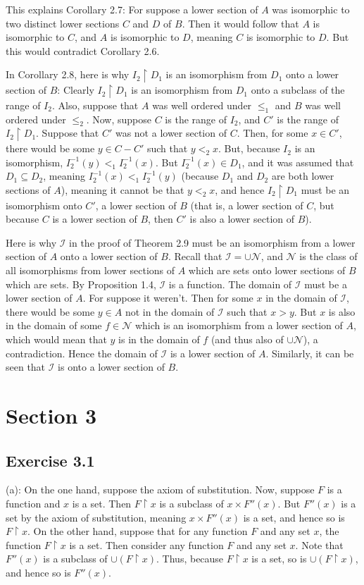 \documentclass{article}
\theoremstyle{definition}
\begin{document}
This explains Corollary 2.7: For suppose a lower section of $A$ was isomorphic to two distinct lower sections $C$ and $D$ of $B$. Then it would follow that 
$A$ is isomorphic to $C$, and $A$ is isomorphic to $D$, meaning $C$ is isomorphic to $D$. But this would contradict Corollary 2.6.

In Corollary 2.8, here is why $I_2\restriction D_1$ is an isomorphism from $D_1$ onto a lower section of $B$: Clearly $I_2\restriction D_1$ is an 
isomorphism from $D_1$ onto a subclass of the range of $I_2$. Also, suppose that $A$ was well ordered under $\le_1$ and $B$ was well ordered under $\le_2$. 
Now, suppose $C$ is the range of $I_2$, and $C'$ is the range of $I_2\restriction D_1$. Suppose that 
$C'$ was not a lower section of $C$. Then, for some $x\in C'$, there would be some $y\in C-C'$ such that $y<_2x$. But, because $I_2$ is an isomorphism, 
$I_2^{-1}(y)<_1I_2^{-1}(x)$. But $I_2^{-1}(x)\in D_1$, and it was assumed that $D_1\subseteq D_2$, meaning $I_2^{-1}(x)<_1I_2^{-1}(y)$ (because 
$D_1$ and $D_2$ are both lower sections of $A$), meaning it cannot be that $y<_2x$, and hence $I_2\restriction D_1$ must be an isomorphism onto $C'$, 
a lower section of $B$ (that is, a lower section of $C$, but because $C$ is a lower section of $B$, then $C'$ is also a lower section of $B$).

Here is why $\mathcal{I}$ in the proof of Theorem 2.9 must be an isomorphism from a lower section of $A$ onto a lower section of $B$. Recall that 
$\mathcal{I}=\cup\mathcal{N}$, and $\mathcal{N}$ is the class of all isomorphisms from lower sections of $A$ which are sets onto lower sections of $B$ which are sets.
By Proposition 1.4, $\mathcal{I}$ is a function. The domain of $\mathcal{I}$ must be a lower section of $A$. For suppose it weren't. Then for some 
$x$ in the domain of $\mathcal{I}$, there would be some $y\in A$ not in the domain of $\mathcal{I}$ such that $x>y$. But $x$ is also in the domain of 
some $f\in\mathcal{N}$ which is an isomorphism from a lower section of $A$, which would mean that $y$ is in the domain of $f$ (and thus also of $\cup\mathcal{N}$), a contradiction. Hence 
the domain of $\mathcal{I}$ is a lower section of $A$. Similarly, it can be seen that $\mathcal{I}$ is onto a lower section of $B$.

\section*{Section 3}

\subsection*{Exercise 3.1}
(a): On the one hand, suppose the axiom of substitution. Now, suppose $F$ is a function and $x$ is a set. Then $F\restriction x$ is a subclass of 
$x\times F''(x)$. But $F''(x)$ is a set by the axiom of substitution, meaning $x\times F''(x)$ is a set, and hence so is $F\restriction x$. On the other hand, 
suppose that for any function $F$ and any set $x$, the function $F\restriction x$ is a set. Then consider any function $F$ and any set $x$. Note that 
$F''(x)$ is a subclass of $\cup(F\restriction x)$. Thus, because $F\restriction x$ is a set, so is $\cup(F\restriction x)$, and hence so is $F''(x)$.
\end{document}
